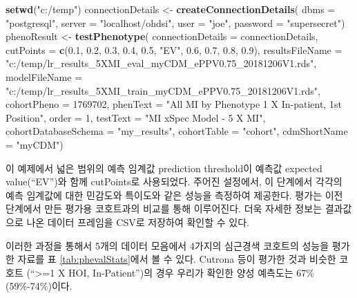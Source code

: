 \documentclass[10.5pt]{book}
\newenvironment{Shaded}{\begin{snugshade}}{\end{snugshade}}
\newcommand{\KeywordTok}[1]{\textcolor[rgb]{0.13,0.29,0.53}{\textbf{#1}}}
\newcommand{\DataTypeTok}[1]{\textcolor[rgb]{0.13,0.29,0.53}{#1}}
\newcommand{\DecValTok}[1]{\textcolor[rgb]{0.00,0.00,0.81}{#1}}
\newcommand{\FloatTok}[1]{\textcolor[rgb]{0.00,0.00,0.81}{#1}}
\newcommand{\StringTok}[1]{\textcolor[rgb]{0.31,0.60,0.02}{#1}}
\newcommand{\NormalTok}[1]{#1}
\theoremstyle{definition}
\theoremstyle{definition}
\theoremstyle{definition}
\theoremstyle{remark}
\begin{document}
\begin{Shaded}
\begin{Highlighting}[]
\KeywordTok{setwd}\NormalTok{(}\StringTok{"c:/temp"}\NormalTok{)}
\NormalTok{connectionDetails <-}\StringTok{ }\KeywordTok{createConnectionDetails}\NormalTok{(}
  \DataTypeTok{dbms =} \StringTok{"postgresql"}\NormalTok{,}
  \DataTypeTok{server =} \StringTok{"localhost/ohdsi"}\NormalTok{,}
  \DataTypeTok{user =} \StringTok{"joe"}\NormalTok{,}
  \DataTypeTok{password =} \StringTok{"supersecret"}\NormalTok{)}
\NormalTok{phenoResult <-}\StringTok{ }\KeywordTok{testPhenotype}\NormalTok{(}
  \DataTypeTok{connectionDetails =}\NormalTok{ connectionDetails,}
  \DataTypeTok{cutPoints =} \KeywordTok{c}\NormalTok{(}\FloatTok{0.1}\NormalTok{, }\FloatTok{0.2}\NormalTok{, }\FloatTok{0.3}\NormalTok{, }\FloatTok{0.4}\NormalTok{, }\FloatTok{0.5}\NormalTok{, }\StringTok{"EV"}\NormalTok{, }\FloatTok{0.6}\NormalTok{, }\FloatTok{0.7}\NormalTok{, }\FloatTok{0.8}\NormalTok{, }\FloatTok{0.9}\NormalTok{),}
  \DataTypeTok{resultsFileName =}
    \StringTok{"c:/temp/lr_results_5XMI_eval_myCDM_ePPV0.75_20181206V1.rds"}\NormalTok{,}
  \DataTypeTok{modelFileName =}
    \StringTok{"c:/temp/lr_results_5XMI_train_myCDM_ePPV0.75_20181206V1.rds"}\NormalTok{,}
  \DataTypeTok{cohortPheno =} \DecValTok{1769702}\NormalTok{,}
  \DataTypeTok{phenText =} \StringTok{"All MI by Phenotype 1 X In-patient, 1st Position"}\NormalTok{,}
  \DataTypeTok{order =} \DecValTok{1}\NormalTok{,}
  \DataTypeTok{testText =} \StringTok{"MI xSpec Model - 5 X MI"}\NormalTok{,}
  \DataTypeTok{cohortDatabaseSchema =} \StringTok{"my_results"}\NormalTok{,}
  \DataTypeTok{cohortTable =} \StringTok{"cohort"}\NormalTok{,}
  \DataTypeTok{cdmShortName =} \StringTok{"myCDM"}\NormalTok{)}
\end{Highlighting}
\end{Shaded}

이 예제에서 넓은 범위의 예측 임계값 prediction threshold이 예측값
expected value(``EV'')와 함께 cutPoints로 사용되었다. 주어진 설정에서,
이 단계에서 각각의 예측 임계값에 대한 민감도와 특이도와 같은 성능을
측정하여 제공한다. 평가는 이전 단계에서 만든 평가용 코호트과의 비교를
통해 이루어진다. 더욱 자세한 정보는 결과값으로 나온 데이터 프레임을
CSV로 저장하여 확인할 수 있다.

이러한 과정을 통해서 5개의 데이터 모음에서 4가지의 심근경색 코호트의
성능을 평가한 자료를 표 \ref{tab:phevalStats}에서 볼 수 있다. Cutrona
등이 평가한 것과 비슷한 코호트 (``\textgreater{}=1 X HOI,
In-Patient'')의 경우 우리가 확인한 양성 예측도는 67\% (59\%-74\%)이다.
\end{document}

